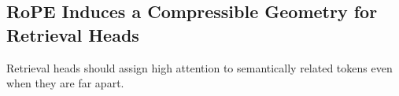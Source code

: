 \documentclass{llmxive}
\providecommand{\yy}[1]{\textbf{[YY: #1]}}
\begin{document}


\subsection{RoPE Induces a Compressible Geometry for Retrieval Heads}
\label{sec:motiv_lowdim_retrieval}

Retrieval heads should assign high attention to semantically related tokens even when they are far apart. 



\end{document}
